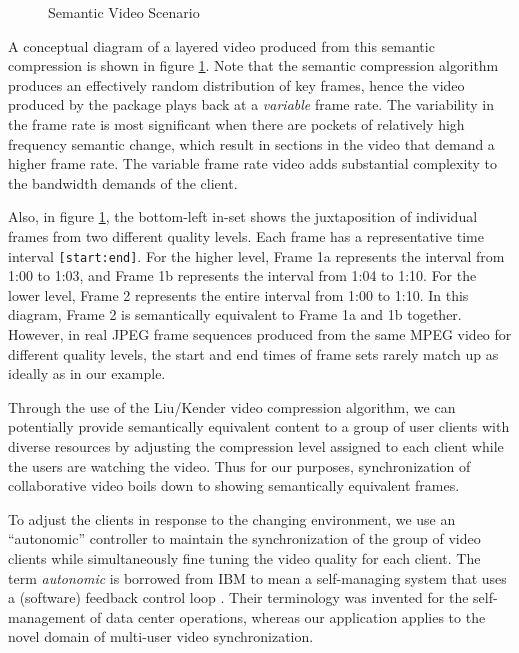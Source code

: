 \documentclass{sig-alternate}
\begin{document}
\begin{figure}
  \centering
  \caption{Semantic Video Scenario}
  \label{sem_video}
\end{figure} 

A conceptual diagram of a layered video produced from this semantic
compression is shown in figure \ref{sem_video}.  Note that the
semantic compression algorithm produces an effectively random
distribution of key frames, hence the video produced by the package
plays back at a {\em variable} frame rate.  The variability in the
frame rate is most significant when there are pockets of relatively
high frequency semantic change, which result in sections in the video
that demand a higher frame rate.  The variable frame rate video adds
substantial complexity to the bandwidth demands of the client.

Also, in figure \ref{sem_video}, the bottom-left in-set shows the
juxtaposition of individual frames from two different quality levels.
Each frame has a representative time interval \texttt{[start:end]}.
For the higher level, Frame 1a represents the interval from 1:00 to
1:03, and Frame 1b represents the interval from 1:04 to 1:10.  For the
lower level, Frame 2 represents the entire interval from 1:00 to 1:10.
In this diagram, Frame 2 is semantically equivalent to Frame 1a and 1b
together.  However, in real JPEG frame sequences produced from the
same MPEG video for different quality levels, the start and end times
of frame sets rarely match up as ideally as in our example.

Through the use of the Liu/Kender video compression algorithm, we can
potentially provide semantically equivalent content to a group of user
clients with diverse resources by adjusting the compression level
assigned to each client while the users are watching the video.  Thus
for our purposes, synchronization of collaborative video boils down to
showing semantically equivalent frames.

To adjust the clients in response to the changing environment, we use
an ``autonomic'' controller to maintain the synchronization of the
group of video clients while simultaneously fine tuning the video
quality for each client.  The term \textit{autonomic} is borrowed from
IBM to mean a self-managing system that uses a (software) feedback
control loop \cite{IBM}.  Their terminology was invented for the
self-management of data center operations, whereas our application
applies to the novel domain of multi-user video synchronization.
\end{document}
